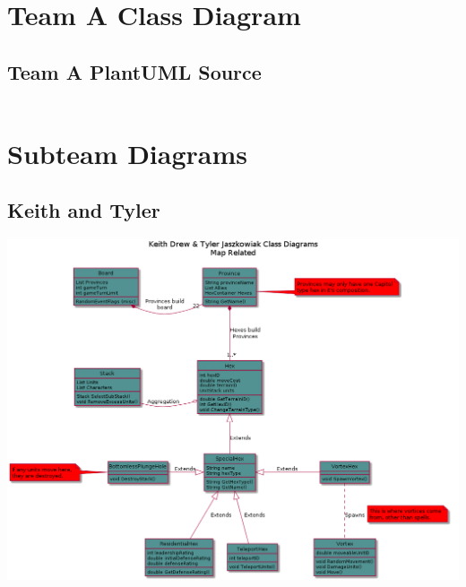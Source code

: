 \documentclass[12pt,a4paper]{article}
\begin{document}
\pagebreak
\section{Team A Class Diagram}

\subsection{Team A PlantUML Source}
\begin{verbatim}

\end{verbatim}

\section{Subteam Diagrams}
\subsection{Keith and Tyler}
\includegraphics[width=\textwidth]{classD}
\end{document}
